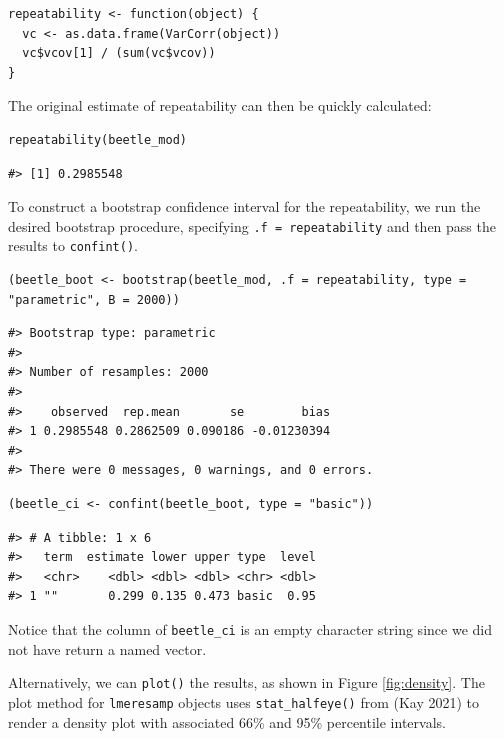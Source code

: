 \begin{verbatim}
repeatability <- function(object) {
  vc <- as.data.frame(VarCorr(object))
  vc$vcov[1] / (sum(vc$vcov))
}
\end{verbatim}

\noindent The original estimate of repeatability can then be quickly calculated:

\begin{verbatim}
repeatability(beetle_mod)
\end{verbatim}

\begin{verbatim}
#> [1] 0.2985548
\end{verbatim}

\noindent To construct a bootstrap confidence interval for the repeatability, we run the desired bootstrap procedure, specifying \texttt{.f\ =\ repeatability} and then pass the results to \texttt{confint()}.

\begin{verbatim}
(beetle_boot <- bootstrap(beetle_mod, .f = repeatability, type = "parametric", B = 2000))
\end{verbatim}

\begin{verbatim}
#> Bootstrap type: parametric 
#> 
#> Number of resamples: 2000 
#> 
#>    observed  rep.mean       se        bias
#> 1 0.2985548 0.2862509 0.090186 -0.01230394
#> 
#> There were 0 messages, 0 warnings, and 0 errors.
\end{verbatim}

\begin{verbatim}
(beetle_ci <- confint(beetle_boot, type = "basic"))
\end{verbatim}

\begin{verbatim}
#> # A tibble: 1 x 6
#>   term  estimate lower upper type  level
#>   <chr>    <dbl> <dbl> <dbl> <chr> <dbl>
#> 1 ""       0.299 0.135 0.473 basic  0.95
\end{verbatim}

Notice that the  column of \texttt{beetle\_ci} is an empty character string since we did not have  return a named vector.

Alternatively, we can \texttt{plot()} the results, as shown in Figure \ref{fig:density}. The plot method for \texttt{lmeresamp} objects uses \texttt{stat\_halfeye()} from  (Kay 2021) to render a density plot with associated 66\% and 95\% percentile intervals.

